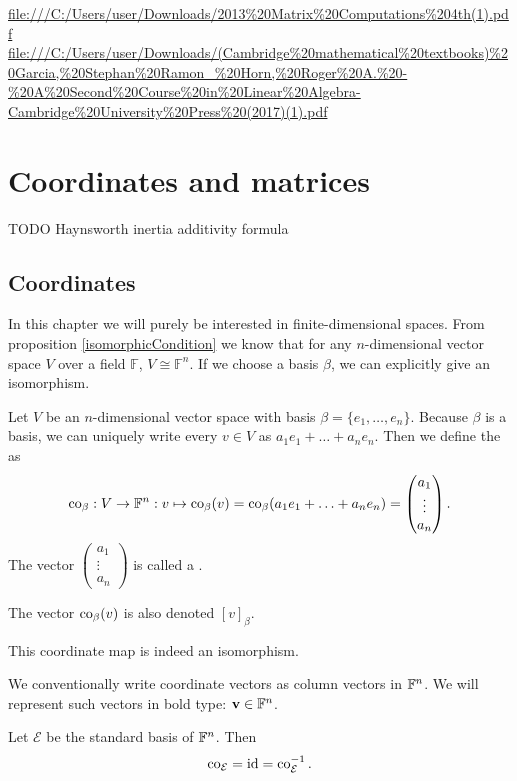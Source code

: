 \url{file:///C:/Users/user/Downloads/2013%20Matrix%20Computations%204th(1).pdf}
\url{file:///C:/Users/user/Downloads/(Cambridge%20mathematical%20textbooks)%20Garcia,%20Stephan%20Ramon_%20Horn,%20Roger%20A.%20-%20A%20Second%20Course%20in%20Linear%20Algebra-Cambridge%20University%20Press%20(2017)(1).pdf}


\chapter{Coordinates and matrices}

TODO Haynsworth inertia additivity formula

\section{Coordinates}
In this chapter we will purely be interested in finite-dimensional spaces. From proposition \ref{isomorphicCondition} we know that for any $n$-dimensional vector space $V$ over a field $\mathbb{F}$, $V\cong \mathbb{F}^n$. If we choose a basis $\beta$, we can explicitly give an isomorphism.
\begin{definition}
Let $V$ be an $n$-dimensional vector space with basis $\beta = \{e_1,\ldots, e_n\}$. Because $\beta$ is a basis, we can uniquely write every $v\in V$ as $a_1e_1+\ldots +a_ne_n$. Then we define the  as
\[ \operatorname{co}_\beta: V \to \mathbb{F}^n: v \mapsto \operatorname{co}_\beta(v) = \operatorname{co}_\beta(a_1e_1+\ldots +a_ne_n) = \begin{pmatrix}
a_1 \\ \vdots \\ a_n
\end{pmatrix}. \]
The vector $\begin{pmatrix}
a_1 \\ \vdots \\ a_n
\end{pmatrix}$ is called a .

The vector $\operatorname{co}_\beta(v)$ is also denoted $[v]_\beta$.
\end{definition}
This coordinate map is indeed an isomorphism.

We conventionally write coordinate vectors as column vectors in $\mathbb{F}^n$. We will represent such vectors in bold type: $\bm{\mathrm{v}}\in\mathbb{F}^n$.

\begin{lemma}
Let $\mathcal{E}$ be the standard basis of $\mathbb{F}^n$. Then
\[ \operatorname{co}_\mathcal{E} = \operatorname{id} = \operatorname{co}_\mathcal{E}^{-1}. \]
\end{lemma}

